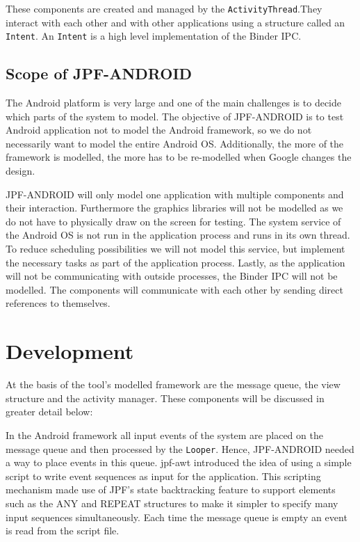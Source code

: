 \documentclass{acm_proc_article-sp}
\begin{document}
These components are created and managed by the \texttt{ActivityThread}.They interact with each other and with other
applications using a structure called an \texttt{Intent}. An \texttt{Intent} is a high level implementation of the Binder IPC.

\subsection{Scope of JPF-ANDROID}
The Android platform is very large and one of the main challenges is to decide which parts of the system to model. The objective of
JPF-ANDROID is to test Android application not to model the Android framework, so we do not necessarily want to model the entire
Android OS. Additionally, the more of the framework is modelled, the more has to be re-modelled when Google changes the design.

JPF-ANDROID will only model one application with multiple components and their interaction. Furthermore the graphics libraries will not
be modelled as we do not have to physically draw on the screen for testing. The system service of the Android OS is not run in the
application process and runs in its own thread. To reduce scheduling possibilities we will not model this service, but implement the
necessary tasks as part of the application process. Lastly, as the application will not be communicating with outside processes, the Binder
IPC will not be modelled. The components will communicate with each other by sending direct references to themselves. 

\section{Development}
At the basis of the tool's modelled framework are the message queue, the view structure and the activity manager. These components will be
discussed in greater detail below:

In the Android framework all input events of the system are placed on the message queue and then processed by the \texttt{Looper}. Hence,
JPF-ANDROID needed a way to place events in this queue. jpf-awt introduced the idea of using a simple script to write event sequences as
input for the application. This scripting mechanism made use of JPF's state backtracking feature to support elements such as the ANY and
REPEAT structures to make it simpler to specify many input sequences simultaneously. Each time the message queue is empty an event is
read from the script file. 
\end{document}
